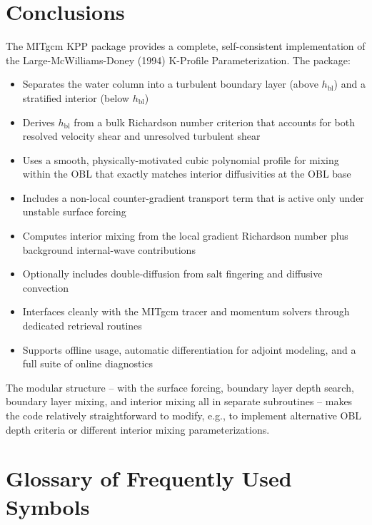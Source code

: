 \documentclass[12pt,letterpaper]{article}
\newcommand{\hbl}{h_{\mathrm{bl}}}
\begin{document}
\section{Conclusions}  
  
The MITgcm KPP package provides a complete, self-consistent implementation  
of the Large-McWilliams-Doney (1994) K-Profile Parameterization. The  
package:  
  
\begin{itemize}  
  \item Separates the water column into a turbulent boundary layer  
        (above $\hbl$) and a stratified interior (below $\hbl$)  
  \item Derives $\hbl$ from a bulk Richardson number criterion that  
        accounts for both resolved velocity shear and unresolved  
        turbulent shear  
  \item Uses a smooth, physically-motivated cubic polynomial profile  
        for mixing within the OBL that exactly matches interior  
        diffusivities at the OBL base  
  \item Includes a non-local counter-gradient transport term that  
        is active only under unstable surface forcing  
  \item Computes interior mixing from the local gradient Richardson  
        number plus background internal-wave contributions  
  \item Optionally includes double-diffusion from salt fingering and  
        diffusive convection  
  \item Interfaces cleanly with the MITgcm tracer and momentum solvers  
        through dedicated retrieval routines  
  \item Supports offline usage, automatic differentiation for adjoint  
        modeling, and a full suite of online diagnostics  
\end{itemize}  
  
The modular structure -- with the surface forcing, boundary layer  
depth search, boundary layer mixing, and interior mixing all in  
separate subroutines -- makes the code relatively straightforward  
to modify, e.g., to implement alternative OBL depth criteria or  
different interior mixing parameterizations.  
  
\appendix  
\section{Glossary of Frequently Used Symbols}  
  
\end{document}
